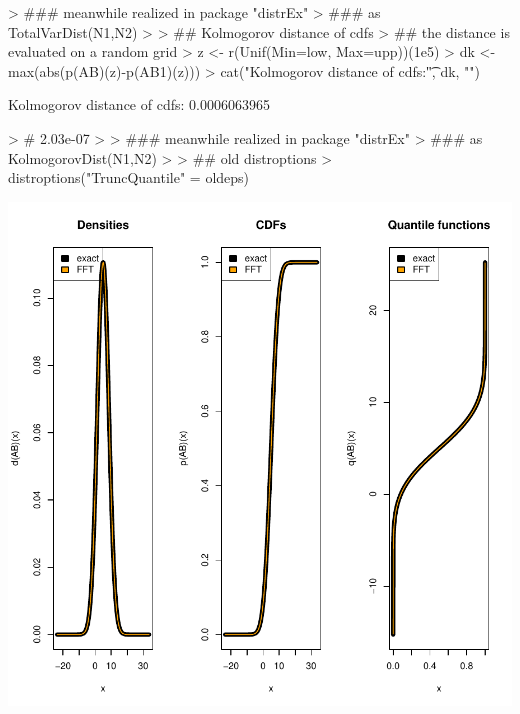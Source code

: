 \documentclass[11pt]{article}
\begin{document}
\begin{Schunk}
\begin{Soutput}
\end{Soutput}
\begin{Sinput}
> ### meanwhile realized in package "distrEx" 
> ### as TotalVarDist(N1,N2)
> 
> ## Kolmogorov distance of cdfs 
> ## the distance is evaluated on a random grid
> z <- r(Unif(Min=low, Max=upp))(1e5)
> dk <- max(abs(p(AB)(z)-p(AB1)(z)))
> cat("Kolmogorov distance of cdfs:\t", dk, "\n") 
\end{Sinput}
\begin{Soutput}
Kolmogorov distance of cdfs:	 0.0006063965 
\end{Soutput}
\begin{Sinput}
> # 2.03e-07
> 
> ### meanwhile realized in package "distrEx" 
> ### as KolmogorovDist(N1,N2)
> 
> ## old distroptions
> distroptions("TruncQuantile" = oldeps)
\end{Sinput}
\end{Schunk}
\includegraphics{distr-ConvolutionNormalDistr}
\end{document}
